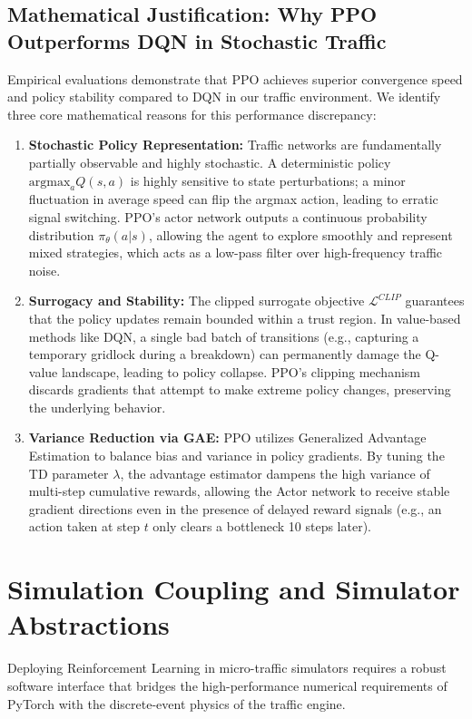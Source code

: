\documentclass[conference]{IEEEtran}
\begin{document}
\subsection{Mathematical Justification: Why PPO Outperforms DQN in Stochastic Traffic}
Empirical evaluations demonstrate that PPO achieves superior convergence speed and policy stability compared to DQN in our traffic environment. We identify three core mathematical reasons for this performance discrepancy:
\begin{enumerate}
    \item \textbf{Stochastic Policy Representation:} Traffic networks are fundamentally partially observable and highly stochastic. A deterministic policy $\text{argmax}_a Q(s, a)$ is highly sensitive to state perturbations; a minor fluctuation in average speed can flip the argmax action, leading to erratic signal switching. PPO's actor network outputs a continuous probability distribution $\pi_\theta(a|s)$, allowing the agent to explore smoothly and represent mixed strategies, which acts as a low-pass filter over high-frequency traffic noise.
    \item \textbf{Surrogacy and Stability:} The clipped surrogate objective $\mathcal{L}^{CLIP}$ guarantees that the policy updates remain bounded within a trust region. In value-based methods like DQN, a single bad batch of transitions (e.g., capturing a temporary gridlock during a breakdown) can permanently damage the Q-value landscape, leading to policy collapse. PPO's clipping mechanism discards gradients that attempt to make extreme policy changes, preserving the underlying behavior.
    \item \textbf{Variance Reduction via GAE:} PPO utilizes Generalized Advantage Estimation to balance bias and variance in policy gradients. By tuning the TD parameter $\lambda$, the advantage estimator dampens the high variance of multi-step cumulative rewards, allowing the Actor network to receive stable gradient directions even in the presence of delayed reward signals (e.g., an action taken at step $t$ only clears a bottleneck 10 steps later).
\end{enumerate}

\section{Simulation Coupling and Simulator Abstractions}
Deploying Reinforcement Learning in micro-traffic simulators requires a robust software interface that bridges the high-performance numerical requirements of PyTorch with the discrete-event physics of the traffic engine.
\end{document}
